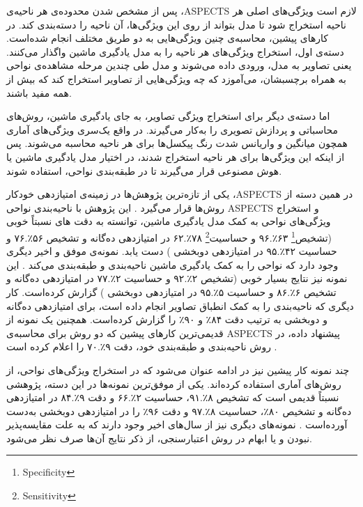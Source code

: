 پس از مشخص شدن محدوده‌ی هر ناحیه‌ی ،ASPECTS لازم است ویژگی‌های اصلی هر ناحیه استخراج شود تا مدل بتواند از روی این ویژگی‌ها، آن ناحیه را دسته‌بندی کند.
در کارهای پیشین، محاسبه‌ی چنین ویژگی‌هایی به دو طریق مختلف انجام شده‌است.
دسته‌ی اول، استخراج ویژگی‌های هر ناحیه را به مدل یادگیری ماشین واگذار می‌کنند.
یعنی تصاویر به مدل، ورودی داده می‌شوند و مدل طی چندین مرحله مشاهده‌ی نواحی به همراه برچسبشان، می‌آموزد که چه ویژگی‌هایی از تصاویر استخراج کند که بیش از همه مفید باشند.

اما دسته‌ی دیگر برای استخراج ویژگی تصاویر، به جای یادگیری ماشین، روش‌های محاسباتی و پردازش تصویری را به‌کار می‌گیرند.
در واقع یک‌سری ویژگی‌های آماری همچون میانگین و واریانس شدت رنگ پیکسل‌ها برای هر ناحیه محاسبه می‌شوند.
پس از اینکه این ویژگی‌ها برای هر ناحیه استخراج شدند، 
در اختیار مدل یادگیری ماشین یا هوش مصنوعی قرار می‌گیرند
تا 
در طبقه‌بندی نواحی، استفاده شوند.

یکی از تازه‌ترین پژوهش‌ها در زمینه‌ی امتیاز‌دهی خودکار ،ASPECTS در همین دسته‌ از روش‌ها قرار می‌گیرد \cite{lee2023clinical}.
این پژوهش با ناحیه‌بندی نواحی ASPECTS و استخراج ویژگی‌های نواحی به کمک مدل یادگیری ماشین، توانسته به دقت های نسبتاً خوبی 
(تشخیص\footnote{Specificity}
۶۳٪.۹۶
و
حساسیت\footnote{Sensitivity}
۷۸٪.۶۲
در امتیازدهی ده‌گانه و 
تشخیص
۵۶٪.۷۶
و
حساسیت
۴۲٪.۹۵
در امتیازدهی دوبخشی 
)
دست یابد.
نمونه‌ی موفق و اخیر دیگری وجود دارد که نواحی را به کمک یادگیری ماشین ناحیه‌بندی و طبقه‌بندی می‌کند \cite{cao2022deep}.
این نمونه نیز نتایج بسیار خوبی 
(تشخیص
۲٪.۹۲
و
حساسیت
۲٪.۷۷
در امتیازدهی ده‌گانه و 
تشخیص
۶٪.۸۶
و
حساسیت
۵٪.۹۵
در امتیازدهی دوبخشی 
)
گزارش کرده‌است.
کار دیگری
\cite{kuang2021eis}
که ناحیه‌بندی را به کمک انطباق تصاویر انجام داده است،
برای امتیازدهی ده‌گانه و دو‌بخشی به ترتیب دقت
۸۴٪ 
و 
۹۰٪ 
را گزارش کرده‌است.
همچنین یک نمونه از قدیمی‌ترین کار‌های پیشین که دو روش برای محاسبه‌ی ASPECTS پیشنهاد داده، در روش ناحیه‌بندی و طبقه‌بندی خود،  
دقت
۹٪.۷۰
را اعلام کرده است \cite{jung2018evaluating}.

چند نمونه کار پیشین نیز در ادامه عنوان می‌شود که در استخراج ویژگی‌های نواحی، از روش‌های آماری استفاده کرده‌اند.
یکی از موفق‌ترین نمونه‌ها در این دسته، پژوهشی نسبتاً قدیمی است که
تشخیص
۸٪.۹۱،
حساسیت
۲٪.۶۶
و دقت 
۹٪.۸۴
در امتیازدهی ده‌گانه و 
تشخیص
۸۰٪،
حساسیت
۸٪.۹۷
و دقت 
۹۶٪
را
در امتیازدهی دوبخشی 
به‌دست آورده‌است \cite{kuang2019automated}.
نمونه‌های دیگری نیز از سال‌های اخیر وجود دارند
\cite{liu2021deep,yu2021automated}
که به علت مقایسه‌پذیر نبودن و یا ابهام در روش اعتبارسنجی، از ذکر نتایج آن‌ها صرف نظر می‌شود.

